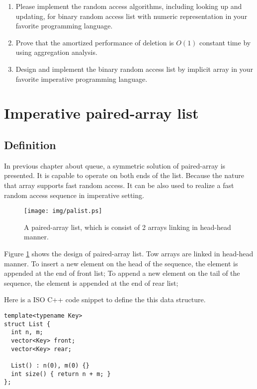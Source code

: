 \documentclass[UTF8]{article}
\begin{document}
\begin{Exercise}
\begin{enumerate}
\item Please implement the random access algorithms, including looking up and updating,
for binary random access list with numeric representation in your favorite programming
language.

\item Prove that the amortized performance of deletion is $O(1)$ constant time by
using aggregation analysis.

\item Design and implement the binary random access list by implicit array in your
favorite imperative programming language.
\end{enumerate}
\end{Exercise}

\section{Imperative paired-array list}

\subsection{Definition}
In previous chapter about queue, a symmetric solution of paired-array is presented.
It is capable to operate on both ends of the list. Because the nature that array supports
fast random access. It can be also used to realize a fast random access sequence
in imperative setting.

\begin{figure}[htbp]
  \centering
  \texttt{[image: img/palist.ps]}
  \caption{A paired-array list, which is consist of 2 arrays linking in head-head manner.} \label{fig:palist}
\end{figure}

Figure \ref{fig:palist} shows the design of paired-array list. Tow arrays are linked in head-head manner.
To insert a new element on the head of the sequence, the element is appended at the end of front list;
To append a new element on the tail of the sequence, the element is appended at the end of rear list;

Here is a ISO C++ code snippet to define the this data structure.

\lstset{language=C++}
\begin{lstlisting}
template<typename Key>
struct List {
  int n, m;
  vector<Key> front;
  vector<Key> rear;

  List() : n(0), m(0) {}
  int size() { return n + m; }
};
\end{lstlisting}
\end{document}
